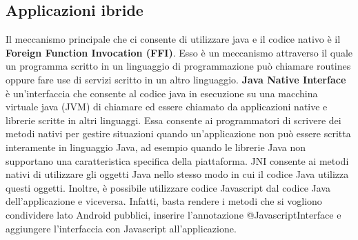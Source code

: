 \documentclass[12pt]{report}
\begin{document}
\subsection{Applicazioni ibride}
Il meccanismo principale che ci consente di utilizzare java e il codice nativo è il \textbf{Foreign Function Invocation (FFI)}. Esso è un meccanismo attraverso il quale un programma scritto in un linguaggio di programmazione può chiamare routines oppure fare use di servizi scritto in un altro linguaggio. \textbf{Java Native Interface} è un'interfaccia che consente al codice java in esecuzione su una macchina virtuale java (JVM) di chiamare ed essere chiamato da applicazioni native e librerie scritte in altri linguaggi. Essa consente ai programmatori di scrivere dei metodi nativi per gestire situazioni quando un'applicazione non può essere scritta interamente in linguaggio Java, ad esempio quando le librerie Java non supportano una caratteristica specifica della piattaforma. JNI consente ai metodi nativi di utilizzare gli oggetti Java nello stesso modo in cui il codice Java utilizza questi oggetti. Inoltre, è possibile utilizzare codice Javascript dal codice Java dell'applicazione e viceversa. Infatti, basta rendere i metodi che si vogliono condividere lato Android pubblici, inserire l'annotazione @JavascriptInterface e aggiungere l'interfaccia con Javascript all'applicazione.
\end{document}
